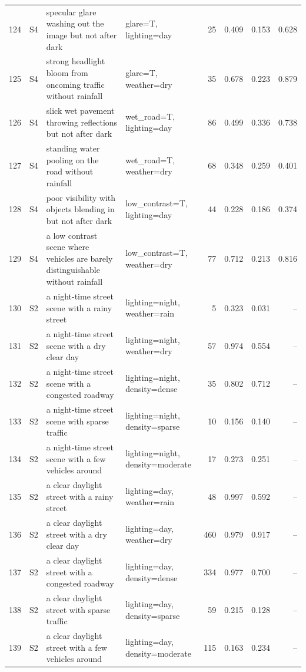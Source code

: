 \begin{longtable}{r l p{5.0cm} p{3.4cm} r r r r}
124 & S4 & specular glare washing out the image but not after dark & glare=T, lighting=day & 25 & 0.409 & 0.153 & 0.628\\
125 & S4 & strong headlight bloom from oncoming traffic without rainfall & glare=T, weather=dry & 35 & 0.678 & 0.223 & 0.879\\
126 & S4 & slick wet pavement throwing reflections but not after dark & wet\_road=T, lighting=day & 86 & 0.499 & 0.336 & 0.738\\
127 & S4 & standing water pooling on the road without rainfall & wet\_road=T, weather=dry & 68 & 0.348 & 0.259 & 0.401\\
128 & S4 & poor visibility with objects blending in but not after dark & low\_contrast=T, lighting=day & 44 & 0.228 & 0.186 & 0.374\\
129 & S4 & a low contrast scene where vehicles are barely distinguishable without rainfall & low\_contrast=T, weather=dry & 77 & 0.712 & 0.213 & 0.816\\
130 & S2 & a night-time street scene with a rainy street & lighting=night, weather=rain & 5 & 0.323 & 0.031 & --\\
131 & S2 & a night-time street scene with a dry clear day & lighting=night, weather=dry & 57 & 0.974 & 0.554 & --\\
132 & S2 & a night-time street scene with a congested roadway & lighting=night, density=dense & 35 & 0.802 & 0.712 & --\\
133 & S2 & a night-time street scene with sparse traffic & lighting=night, density=sparse & 10 & 0.156 & 0.140 & --\\
134 & S2 & a night-time street scene with a few vehicles around & lighting=night, density=moderate & 17 & 0.273 & 0.251 & --\\
135 & S2 & a clear daylight street with a rainy street & lighting=day, weather=rain & 48 & 0.997 & 0.592 & --\\
136 & S2 & a clear daylight street with a dry clear day & lighting=day, weather=dry & 460 & 0.979 & 0.917 & --\\
137 & S2 & a clear daylight street with a congested roadway & lighting=day, density=dense & 334 & 0.977 & 0.700 & --\\
138 & S2 & a clear daylight street with sparse traffic & lighting=day, density=sparse & 59 & 0.215 & 0.128 & --\\
139 & S2 & a clear daylight street with a few vehicles around & lighting=day, density=moderate & 115 & 0.163 & 0.234 & --\\

\end{longtable}
